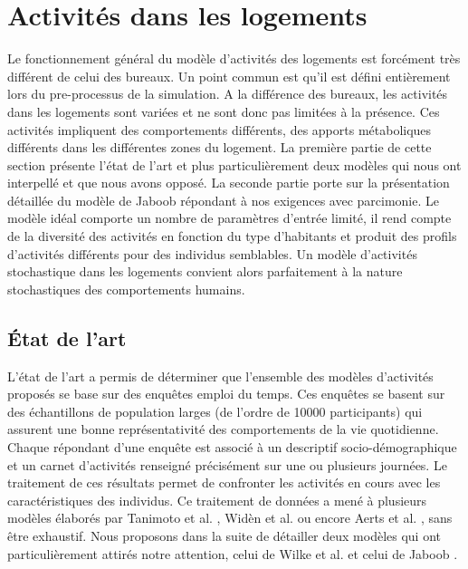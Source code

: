 \newpage
\section{Activités dans les logements}
\label{Logements}

Le fonctionnement général du modèle d'activités des logements est forcément très différent de celui des bureaux. Un point commun est qu'il est défini entièrement lors du pre-processus de la simulation. A la différence des bureaux, les activités dans les logements sont variées et ne sont donc pas limitées à la présence. Ces activités impliquent des comportements différents, des apports métaboliques différents dans les différentes zones du logement. La première partie de cette section présente l'état de l'art et plus particulièrement deux modèles qui nous ont interpellé et que nous avons opposé. La seconde partie porte sur la présentation détaillée du modèle de Jaboob \cite{Jaboob-16} répondant à nos exigences avec parcimonie. Le modèle idéal comporte un nombre de paramètres d'entrée limité, il rend compte de la diversité des activités en fonction du type d'habitants et produit des profils d'activités différents pour des individus semblables. Un modèle d'activités stochastique dans les logements convient alors parfaitement à la nature stochastiques des comportements humains.

\subsection{État de l'art}

L'état de l'art a permis de déterminer que l'ensemble des modèles d'activités proposés se base sur des enquêtes emploi du temps. Ces enquêtes se basent sur des échantillons de population larges (de l'ordre de 10000 participants) qui assurent une bonne représentativité des comportements de la vie quotidienne. Chaque répondant d'une enquête est associé à un descriptif socio-démographique et un carnet d'activités renseigné précisément sur une ou plusieurs journées. Le traitement de ces résultats permet de confronter les activités en cours avec les caractéristiques des individus. Ce traitement de données a mené à plusieurs modèles élaborés par Tanimoto et al. \cite{Tanimoto-08}, Widèn et al. \cite{Widen-12} ou encore Aerts et al. \cite{Aerts-14}, sans être exhaustif. Nous proposons dans la suite de détailler deux modèles qui ont particulièrement attirés notre attention, celui de Wilke et al. \cite{Wilke-13} et celui de Jaboob \cite{Jaboob-16}.

